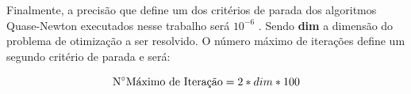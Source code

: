 Finalmente, a precisão que define um dos critérios de parada dos algoritmos Quase-Newton executados nesse trabalho será $10^{-6}$ . Sendo \textbf{dim} a dimensão do problema de otimização a ser resolvido. O número máximo de iterações define um segundo critério de parada e será:

\begin{equation}\label{eq:maxevals}
    \textrm{N\degree Máximo de Iteração} = 2 * dim * 100    
\end{equation}

\newpage